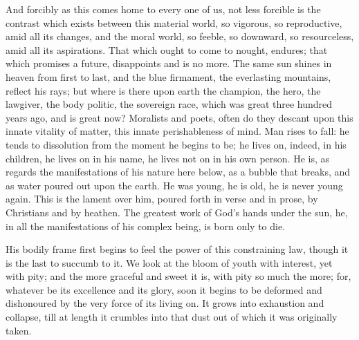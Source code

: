 And forcibly as this comes home to every one of us,
not less forcible is the contrast which exists between
this material world, so vigorous, so reproductive, amid
all its changes, and the moral world, so feeble, so
downward, so resourceless, amid all its aspirations. That
which ought to come to nought, endures; that which
promises a future, disappoints and is no more. The same
sun shines in heaven from first to last, and the blue
firmament, the everlasting mountains, reflect his rays;
but where is there upon earth the champion, the hero, the
lawgiver, the body politic, the sovereign race, which was
great three hundred years ago, and is great now?
Moralists and poets, often do they descant upon this innate vitality of matter, this innate perishableness of
mind. Man rises to fall: he tends to dissolution from the
moment he begins to be; he lives on, indeed, in his
children, he lives on in his name, he lives not on in his
own person. He is, as regards the manifestations of his
nature here below, as a bubble that breaks, and as water
poured out upon the earth. He was young, he is old, he is
never young again. This is the lament over him, poured
forth in verse and in prose, by Christians and by
heathen. The greatest work of God's hands under the sun,
he, in all the manifestations of his complex being, is
born only to die.

His bodily frame first begins to feel the power of
this constraining law, though it is the last to succumb
to it. We look at the bloom of youth with interest, yet
with pity; and the more graceful and sweet it is, with
pity so much the more; for, whatever be its excellence
and its glory, soon it begins to be deformed and
dishonoured by the very force of its living on. It grows
into exhaustion and collapse, till at length it crumbles
into that dust out of which it was originally taken.

